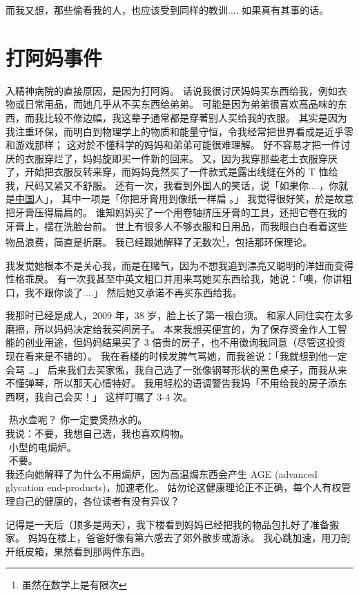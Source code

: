 \documentclass[12pt]{report}
\newcommand{\tab}{\hspace*{1cm}}
\newcommand*\dashh{\textemdash\,\,}
\begin{document}
而我又想，那些偷看我的人，也应该受到同样的教训.... 如果真有其事的话。

\chapter{打阿妈事件}

入精神病院的直接原因，是因为打阿妈。 话说我很讨厌妈妈买东西给我，例如衣物或日常用品，而她几乎从不买东西给弟弟。 可能是因为弟弟很喜欢高品味的东西，而我比较不修边幅，我这辈子通常都是穿著别人买给我的衣服。 其实是因为我注重环保，而明白到物理学上的物质和能量守恒，令我经常把世界看成是近乎零和游戏那样； 这对於不懂科学的妈妈和弟弟可能很难理解。 好不容易才把一件讨厌的衣服穿烂了，妈妈旋即买一件新的回来。 又，因为我穿那些老土衣服穿厌了，开始把衣服反转来穿，而妈妈竟然买了一件款式是露出线缝在外的 T 恤给我，尺码又紧又不舒服。 还有一次，我看到外国人的笑话，说「如果你....，你就是\uline{中国}人」， 其中一项是「你把牙膏用到像纸一样扁 。」 我觉得很好笑，於是故意把牙膏压得扁扁的。 谁知妈妈买了一个用卷轴挤压牙膏的工具，还把它卷在我的牙膏上，摆在洗脸台前。 世上有很多人不够衣服和日用品，而我眼白白看着这些物品浪费，简直是折磨。 我已经跟她解释了无数次\footnote{虽然在数学上是有限次}，包括那环保理论。

我发觉她根本不是关心我，而是在赌气，因为不想我追到漂亮又聪明的洋妞而变得性格乖戾。 有一次我甚至中英文粗口并用来骂她买东西给我，她说：「噢，你讲粗口，我不跟你谈了....」 然后她又承诺不再买东西给我。

我那时已经是成人，2009 年，38 岁，脸上长了第一根白须。 和家人同住实在太多磨擦，所以妈妈决定给我买间房子。 本来我想买便宜的，为了保存资金作人工智能的创业用途，但妈妈结果买了 3 倍贵的房子，也不用徵询我同意（尽管这投资现在看来是不错的）。 我在看楼的时候发脾气骂她，而我爸说：「我就想到他一定会骂 …」 后来我们去买家俬，我自己选了一张像钢琴形状的黑色桌子，而我从来不懂弹琴，所以那天心情特好。 我用轻松的语调警告我妈「不用给我的房子添东西啊，我自己会买！」 这样叮嘱了 3-4 次。

\tab \dashh 热水壶呢？ 你一定要煲热水的。\\
\tab 我说：不要，我想自己选，我也喜欢购物。\\
\tab \dashh 小型的电焗炉。\\
\tab \dashh 不要。\\
我还向她解释了为什么不用焗炉，因为高温焗东西会产生 AGE (advanced glycation end-products)，加速老化。 姑勿论这健康理论正不正确，每个人有权管理自己的健康的，各位读者有没有异议？

记得是一天后（顶多是两天），我下楼看到妈妈已经把我的物品包扎好了准备搬家。 妈妈在楼上，爸爸好像有第六感去了郊外散步或游泳。 我心跳加速，用刀剖开纸皮箱，果然看到那两件东西。
\end{document}
